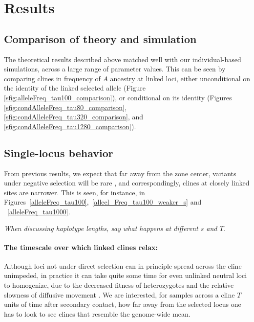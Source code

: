 \documentclass[11pt,letterpaper]{article}
\newcommand{\plr}[1]{{\em \color{blue} #1}}
\begin{document}
\section*{Results}

\subsection*{Comparison of theory and simulation}

The theoretical results described above matched well with our individual-based simulations,
across a large range of parameter values.
This can be seen by comparing
clines in frequency of $A$ ancestry at linked loci,
either unconditional on the identity of the linked selected allele (Figure \ref{sfig:alleleFreq_tau100_comparison}),
or conditional on its identity 
(Figures \ref{sfig:condAlleleFreq_tau80_comparison}, \ref{sfig:condAlleleFreq_tau320_comparison}, and \ref{sfig:condAlleleFreq_tau1280_comparison}).


\subsection*{Single-locus behavior}

From previous results, we expect that far away from the zone center, variants under negative selection will be rare \citep[for demonstration of this theoretical result, see e.g.][]{May1975,Slatkin1973,Barton??}, and correspondingly, clines at closely linked sites are narrower.
This is seen, for instance, in Figures~\ref{alleleFreq_tau100},~\ref{alleel_Freq_tau100_weaker_s} and ~\ref{alleleFreq_tau1000}. 

\plr{When discussing haplotype lengths, say what happens at different $s$ and $T$.}

\paragraph{The timescale over which linked clines relax:}
Although loci not under direct selection can in principle spread across the cline unimpeded,
in practice it can take quite some time for even unlinked neutral loci to homogenize,
due to the decreased fitness of heterozygotes \citep{Barton1986}
and the relative slowness of diffusive movement \citep{Sedghifar2015}.
We are interested, for samples across a cline $T$ units of time after secondary contact, how far away from the selected locus one has to look to see clines that resemble the genome-wide mean.
\end{document}
